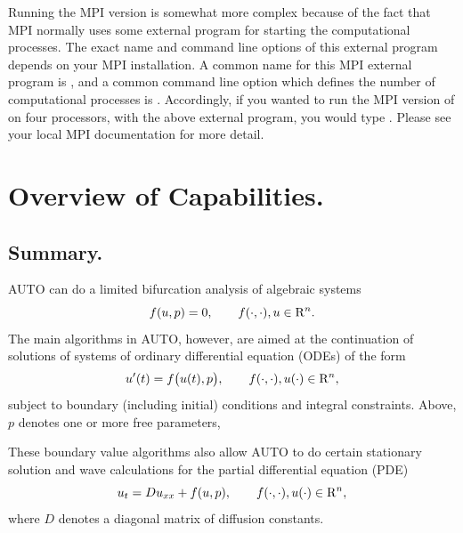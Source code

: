 \documentclass[12pt]{report}
\def\Rn{{\rm R}^n}
\begin{document}
Running the MPI version is somewhat more complex because of the fact
that MPI normally uses some external program for starting the
computational processes.  The exact name and command line options of
this external program depends on your MPI installation.  A common name
for this MPI external program is , and a common command
line option which defines the number of computational processes is .  Accordingly, if you wanted to run the MPI version of \AUTO
on four processors, with the above external program, you would
type .  Please see your local MPI
documentation for more detail.

\chapter{ Overview of Capabilities.} \label{ch:Overview}
\section{ Summary.} \label{sec:Summary}
{\cal AUTO} can do a limited bifurcation analysis of algebraic systems
\begin{equation} \label{1} 
  f( u , p ) = 0 ,  \qquad  f(\cdot,\cdot) , u \in \Rn.
\end{equation}
The main algorithms in {\cal AUTO}, however, are aimed at the continuation
of solutions of systems of ordinary differential equation (ODEs) of the form
\begin{equation} \label{2} 
 u'(t) = f\bigl( u(t) , p \bigr) , 
  \qquad  f(\cdot,\cdot) , u(\cdot) \in \Rn,
\end{equation}
subject to boundary (including initial) conditions and integral constraints.
Above, $p$ denotes one or more free parameters,

These boundary value algorithms also allow {\cal AUTO} to do certain stationary 
solution and wave calculations for the partial differential equation (PDE)
\begin{equation} \label{3} 
  u_t = D u_{xx} + f( u , p ), 
  \qquad  f(\cdot,\cdot) , u(\cdot) \in \Rn,
\end{equation}
where $D$ denotes a diagonal matrix of diffusion constants.
\end{document}
